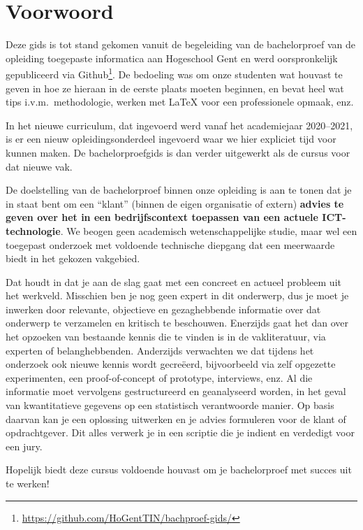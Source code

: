 \chapter*{Voorwoord}
\label{ch:voorwoord}

Deze gids is tot stand gekomen vanuit de begeleiding van de bachelorproef van de opleiding toegepaste informatica aan Hogeschool Gent en werd oorspronkelijk gepubliceerd via Github\footnote{\url{https://github.com/HoGentTIN/bachproef-gids/}}. De bedoeling was om onze studenten wat houvast te geven in hoe ze hieraan in de eerste plaats moeten beginnen, en bevat heel wat tips i.v.m.\ methodologie, werken met {\LaTeX} voor een professionele opmaak, enz.

In het nieuwe curriculum, dat ingevoerd werd vanaf het academiejaar 2020--2021, is er een nieuw opleidingsonderdeel ingevoerd waar we hier expliciet tijd voor kunnen maken. De bachelorproefgids is dan verder uitgewerkt als de cursus voor dat nieuwe vak.

De doelstelling van de bachelorproef binnen onze opleiding is aan te tonen dat je in staat bent om een ``klant'' (binnen de eigen organisatie of extern) \textbf{advies te geven over het in een bedrijfscontext toepassen van een actuele ICT-technologie}. We beogen geen academisch wetenschappelijke studie, maar wel een toegepast onderzoek met voldoende technische diepgang dat een meerwaarde biedt in het gekozen vakgebied.

Dat houdt in dat je aan de slag gaat met een concreet en actueel probleem uit het werkveld. Misschien ben je nog geen expert in dit onderwerp, dus je moet je inwerken door relevante, objectieve en gezaghebbende informatie over dat onderwerp te verzamelen en kritisch te beschouwen. Enerzijds gaat het dan over het opzoeken van bestaande kennis die te vinden is in de vakliteratuur, via experten of belanghebbenden. Anderzijds verwachten we dat tijdens het onderzoek ook nieuwe kennis wordt gecreëerd, bijvoorbeeld via zelf opgezette experimenten, een proof-of-concept of prototype, interviews, enz. Al die informatie moet vervolgens gestructureerd en geanalyseerd worden, in het geval van kwantitatieve gegevens op een statistisch verantwoorde manier. Op basis daarvan kan je een oplossing uitwerken en je advies formuleren voor de klant of opdrachtgever. Dit alles verwerk je in een scriptie die je indient en verdedigt voor een jury.

Hopelijk biedt deze cursus voldoende houvast om je bachelorproef met succes uit te werken!

